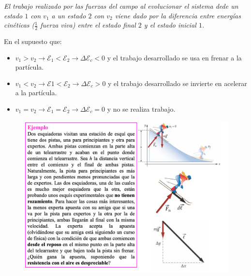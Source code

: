 \emph{El trabajo realizado por las fuerzas del campo al evolucionar el sistema dede un estado $1$ con $v_1$ a un estado $2$ con $v_2$ viene dado por la diferencia entre energías cinéticas ($\frac 1 2$ fuerza viva) entre el estado final $2$ y el estado inicial $1$.}


En el supuesto que:
\vspace{-2mm}\begin{itemize}
\vspace{-2mm}\item $v_1>v_2 \to \mathcal E_1 < \mathcal E_2 \to \Delta \mathcal E_c<0$ y el trabajo desarrollado se usa en frenar a la partícula.
\vspace{-2mm}\item $v_1<v_2 \to \mathcal E1 < \mathcal E_2 \to \Delta \mathcal E_c>0$ y el trabajo desarrollado se invierte en acelerar a la partícula.
\vspace{-2mm}\item $v_1=v_2 \to \mathcal E_1 = \mathcal E_2 \to \Delta \mathcal E_c=0$ y no se realiza trabajo. 	
\end{itemize}

\begin{figure}[H]
		\centering
		\includegraphics[width=1\textwidth]{imagenes/imagenes03/T03IM05.png}
		\end{figure}


